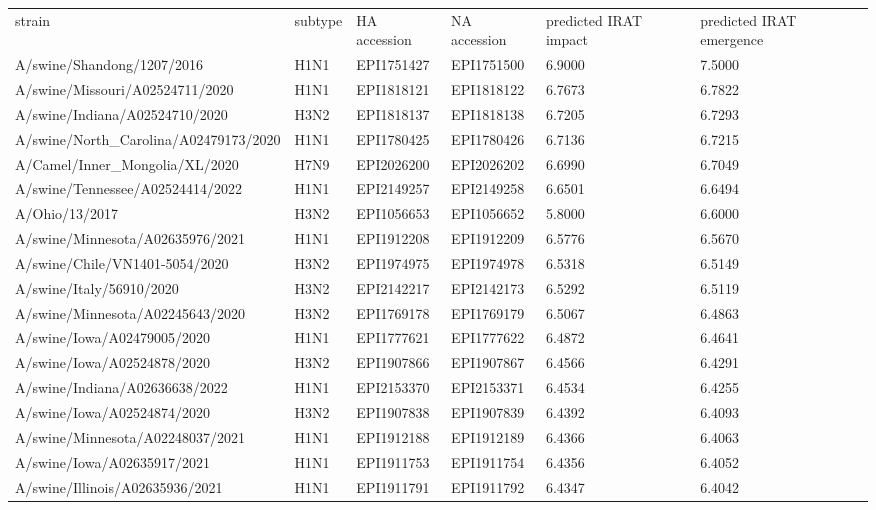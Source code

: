 \begin{tabular}{L{1.95in}|L{.25in}|L{.60in}|L{.6in}|C{1in}|C{1in}}\hline
strain&subtype& HA  accession & NA  accession & predicted  IRAT  impact & predicted  IRAT  emergence \\
A/swine/Shandong/1207/2016&H1N1&EPI1751427&EPI1751500&6.9000&7.5000\\
A/swine/Missouri/A02524711/2020&H1N1&EPI1818121&EPI1818122&6.7673&6.7822\\
A/swine/Indiana/A02524710/2020&H3N2&EPI1818137&EPI1818138&6.7205&6.7293\\
A/swine/North\_Carolina/A02479173/2020&H1N1&EPI1780425&EPI1780426&6.7136&6.7215\\
A/Camel/Inner\_Mongolia/XL/2020&H7N9&EPI2026200&EPI2026202&6.6990&6.7049\\
A/swine/Tennessee/A02524414/2022&H1N1&EPI2149257&EPI2149258&6.6501&6.6494\\
A/Ohio/13/2017&H3N2&EPI1056653&EPI1056652&5.8000&6.6000\\
A/swine/Minnesota/A02635976/2021&H1N1&EPI1912208&EPI1912209&6.5776&6.5670\\
A/swine/Chile/VN1401-5054/2020&H3N2&EPI1974975&EPI1974978&6.5318&6.5149\\
A/swine/Italy/56910/2020&H3N2&EPI2142217&EPI2142173&6.5292&6.5119\\
A/swine/Minnesota/A02245643/2020&H3N2&EPI1769178&EPI1769179&6.5067&6.4863\\
A/swine/Iowa/A02479005/2020&H1N1&EPI1777621&EPI1777622&6.4872&6.4641\\
A/swine/Iowa/A02524878/2020&H3N2&EPI1907866&EPI1907867&6.4566&6.4291\\
A/swine/Indiana/A02636638/2022&H1N1&EPI2153370&EPI2153371&6.4534&6.4255\\
A/swine/Iowa/A02524874/2020&H3N2&EPI1907838&EPI1907839&6.4392&6.4093\\
A/swine/Minnesota/A02248037/2021&H1N1&EPI1912188&EPI1912189&6.4366&6.4063\\
A/swine/Iowa/A02635917/2021&H1N1&EPI1911753&EPI1911754&6.4356&6.4052\\
A/swine/Illinois/A02635936/2021&H1N1&EPI1911791&EPI1911792&6.4347&6.4042\\

\end{tabular}
